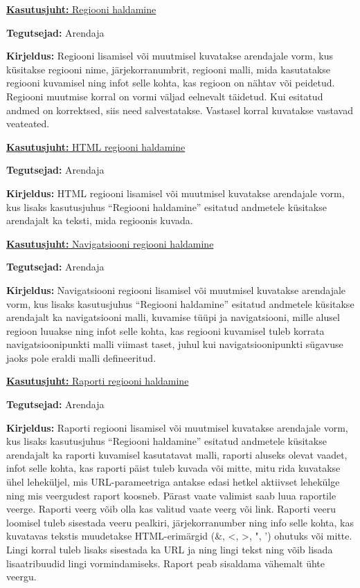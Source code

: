 \documentclass[a4paper,12pt]{article} %
\begin{document}
\underline{\textbf{Kasutusjuht:} Regiooni haldamine}
\par
\textbf{Tegutsejad:} Arendaja
\par
\textbf{Kirjeldus:} Regiooni lisamisel või muutmisel kuvatakse arendajale vorm, kus küsitakse regiooni nime, järjekorranumbrit, regiooni malli, mida kasutatakse regiooni kuvamisel ning infot selle kohta, kas regioon on nähtav või peidetud. Regiooni muutmise korral on vormi väljad eelnevalt täidetud. Kui esitatud andmed on korrektsed, siis need salvestatakse. Vastasel korral kuvatakse vastavad veateated.

\underline{\textbf{Kasutusjuht:} HTML regiooni haldamine}
\par
\textbf{Tegutsejad:} Arendaja
\par
\textbf{Kirjeldus:} HTML regiooni lisamisel või muutmisel kuvatakse arendajale vorm, kus lisaks kasutusjuhus ``Regiooni haldamine'' esitatud andmetele küsitakse arendajalt ka teksti, mida regioonis kuvada.

\underline{\textbf{Kasutusjuht:} Navigatsiooni regiooni haldamine}
\par
\textbf{Tegutsejad:} Arendaja
\par
\textbf{Kirjeldus:} Navigatsiooni regiooni lisamisel või muutmisel kuvatakse arendajale vorm, kus lisaks kasutusjuhus ``Regiooni haldamine'' esitatud andmetele küsitakse arendajalt ka navigatsiooni malli, kuvamise tüüpi ja navigatsiooni, mille alusel regioon luuakse ning infot selle kohta, kas regiooni kuvamisel tuleb korrata navigatsioonipunkti malli viimast taset, juhul kui navigatsioonipunkti sügavuse jaoks pole eraldi malli defineeritud.

\underline{\textbf{Kasutusjuht:} Raporti regiooni haldamine}
\par
\textbf{Tegutsejad:} Arendaja
\par
\textbf{Kirjeldus:} Raporti regiooni lisamisel või muutmisel kuvatakse arendajale vorm, kus lisaks kasutusjuhus ``Regiooni haldamine'' esitatud andmetele küsitakse arendajalt ka raporti kuvamisel kasutatavat malli, raporti aluseks olevat vaadet, infot selle kohta, kas raporti päist tuleb kuvada või mitte, mitu rida kuvatakse ühel leheküljel, mis URL-parameetriga antakse edasi hetkel aktiivset lehekülge ning mis veergudest raport koosneb. Pärast vaate valimist saab luua raportile veerge. Raporti veerg võib olla kas valitud vaate veerg või link. Raporti veeru loomisel tuleb sisestada veeru pealkiri, järjekorranumber ning info selle kohta, kas kuvatavas tekstis muudetakse HTML-erimärgid (\&, <, >, ", ') ohutuks või mitte. Lingi korral tuleb lisaks sisestada ka URL ja ning lingi tekst ning võib lisada lisaatribuudid lingi vormindamiseks. Raport peab sisaldama vähemalt ühte veergu.
\end{document}

